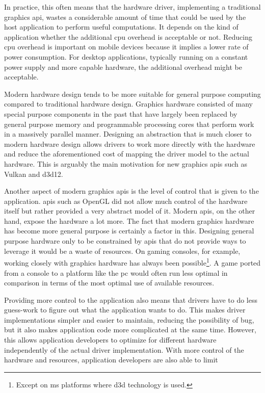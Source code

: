     In practice, this often means that the hardware driver, implementing a traditional graphics \gls{api}, wastes a considerable amount of time that could be used by the host application to perform useful computations.
    It depends on the kind of application whether the additional \gls{cpu} overhead is acceptable or not.
    Reducing \gls{cpu} overhead is important on mobile devices because it implies a lower rate of power consumption.
    For desktop applications, typically running on a constant power supply and more capable hardware, the additional overhead might be acceptable.

    Modern hardware design tends to be more suitable for general purpose computing compared to traditional hardware design.
    Graphics hardware consisted of many special purpose components in the past that have largely been replaced by general purpose memory and programmable processing cores that perform work in a massively parallel manner.
    Designing an abstraction that is much closer to modern hardware design allows drivers to work more directly with the hardware and reduce the aforementioned cost of mapping the driver model to the actual hardware.
    This is arguably the main motivation for new graphics \glspl{api} such as Vulkan and \gls{d3d12}.

    Another aspect of modern graphics \glspl{api} is the level of control that is given to the application.
    \glspl{api} such as OpenGL did not allow much control of the hardware itself but rather provided a very abstract model of it.
    Modern \glspl{api}, on the other hand, expose the hardware a lot more.
    The fact that modern graphics hardware has become more general purpose is certainly a factor in this.
    Designing general purpose hardware only to be constrained by \glspl{api} that do not provide ways to leverage it would be a waste of resources.
    On gaming consoles, for example, working closely with graphics hardware has always been possible\footnote{Except on \gls{ms} platforms where \gls{d3d} technology is used.}.
    A game ported from a console to a platform like the \gls{pc} would often run less optimal in comparison in terms of the most optimal use of available resources.

    Providing more control to the application also means that drivers have to do less guess-work to figure out what the application wants to do.
    This makes driver implementations simpler and easier to maintain, reducing the possibility of bug, but it also makes application code more complicated at the same time.
    However, this allows application developers to optimize for different hardware independently of the actual driver implementation.
    With more control of the hardware and resources, application developers are also able to limit

